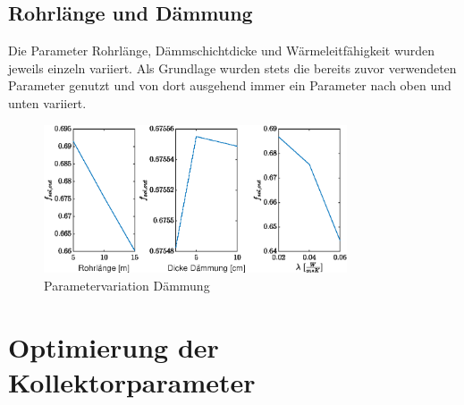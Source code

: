 \subsection{Rohrlänge und Dämmung}
Die Parameter Rohrlänge, Dämmschichtdicke und Wärmeleitfähigkeit wurden jeweils einzeln variiert. Als Grundlage wurden stets die bereits zuvor verwendeten Parameter genutzt und von dort ausgehend immer ein Parameter nach oben und unten variiert.


\begin{figure}[H]
	\centering
	\includegraphics[width=0.8\textwidth]{../DATA/Aufgabe2.3.eps}
	\caption[Parametervariation Dämmung]{Parametervariation Dämmung}
	\label{fig:par2}
\end{figure}

\section{Optimierung der Kollektorparameter}

